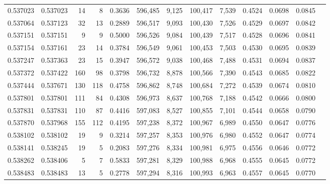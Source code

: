 \begin{tabular}{rrrrrrrrrrrrr}
0.537023 & 0.537023 &    14 &     8 &                                     0.3636 & 596,485 &   9,125 & 100,417 &   7,539 & 0.4524 & 0.0698 & 0.0845 \\
0.537064 & 0.537123 &    32 &    13 &                                     0.2889 & 596,517 &   9,093 & 100,430 &   7,526 & 0.4529 & 0.0697 & 0.0842 \\
0.537151 & 0.537151 &     9 &     9 &                                     0.5000 & 596,526 &   9,084 & 100,439 &   7,517 & 0.4528 & 0.0696 & 0.0841 \\
0.537154 & 0.537161 &    23 &    14 &                                     0.3784 & 596,549 &   9,061 & 100,453 &   7,503 & 0.4530 & 0.0695 & 0.0839 \\
0.537247 & 0.537363 &    23 &    15 &                                     0.3947 & 596,572 &   9,038 & 100,468 &   7,488 & 0.4531 & 0.0694 & 0.0837 \\
0.537372 & 0.537422 &   160 &    98 &                                     0.3798 & 596,732 &   8,878 & 100,566 &   7,390 & 0.4543 & 0.0685 & 0.0822 \\
0.537444 & 0.537671 &   130 &   118 &                                     0.4758 & 596,862 &   8,748 & 100,684 &   7,272 & 0.4539 & 0.0674 & 0.0810 \\
0.537801 & 0.537801 &   111 &    84 &                                     0.4308 & 596,973 &   8,637 & 100,768 &   7,188 & 0.4542 & 0.0666 & 0.0800 \\
0.537831 & 0.537831 &   110 &    87 &                                     0.4416 & 597,083 &   8,527 & 100,855 &   7,101 & 0.4544 & 0.0658 & 0.0790 \\
0.537870 & 0.537968 &   155 &   112 &                                     0.4195 & 597,238 &   8,372 & 100,967 &   6,989 & 0.4550 & 0.0647 & 0.0776 \\
0.538102 & 0.538102 &    19 &     9 &                                     0.3214 & 597,257 &   8,353 & 100,976 &   6,980 & 0.4552 & 0.0647 & 0.0774 \\
0.538141 & 0.538245 &    19 &     5 &                                     0.2083 & 597,276 &   8,334 & 100,981 &   6,975 & 0.4556 & 0.0646 & 0.0772 \\
0.538262 & 0.538406 &     5 &     7 &                                     0.5833 & 597,281 &   8,329 & 100,988 &   6,968 & 0.4555 & 0.0645 & 0.0772 \\
0.538483 & 0.538483 &    13 &     5 &                                     0.2778 & 597,294 &   8,316 & 100,993 &   6,963 & 0.4557 & 0.0645 & 0.0770 \\

\end{tabular}
